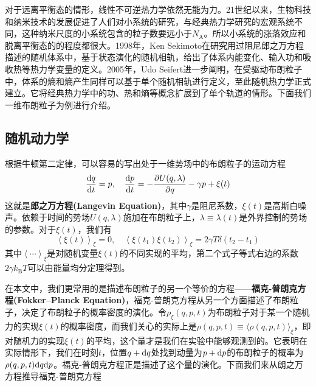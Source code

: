 对于远离平衡态的情形，线性不可逆热力学依然无能为力。21世纪以来，生物科技和纳米技术的发展促进了人们对小系统的研究，与经典热力学研究的宏观系统不同，这种纳米尺度的小系统包含的粒子数要远小于$N_{\mathrm{A}}$。所以小系统的涨落效应和脱离平衡态的的程度都很大。1998年，Ken Sekimoto在研究用过阻尼郎之万方程描述的随机体系中，基于状态演化的随机相轨，给出了体系内能变化、输入功和吸收热等热力学变量的定义\cite{Sekimoto1998}。2005年，Udo Seifert进一步阐明，在受驱动布朗粒子中，体系的熵和熵产生同样可以基于单个随机相轨进行定义\cite{Seifert2005}，至此随机热力学正式建立。它将经典热力学中的功、热和熵等概念扩展到了单个轨道的情形。下面我们一维布朗粒子为例进行介绍。

\subsection{随机动力学}
\label{c1s3}
\qquad 根据牛顿第二定律，可以容易的写出处于一维势场中的布朗粒子的运动方程
\begin{equation}
    \frac{\mathrm{d} q}{\mathrm{d} t}=p, \quad \frac{\mathrm{d} p}{\mathrm{d} t}=-\frac{\partial U(q,\lambda)}{\partial q}-\gamma p+\xi(t)
    \label{eq1.1}
\end{equation}
这就是\textbf{郎之万方程(Langevin Equation)}，其中$\gamma$是阻尼系数，$\xi(t)$是高斯白噪声。依赖于时间的势场$U(q,\lambda)$施加在布朗粒子上，$\lambda\equiv\lambda(t)$是外界控制的势场的参数。对于$\xi(t)$，我们有
\begin{equation}
    \left\langle\xi\left(t\right)\right\rangle_{\xi}=0,\quad \left\langle\xi\left(t_{1}\right) \xi\left(t_{2}\right)\right\rangle_{\xi}=2 \gamma T  \delta\left(t_{2}-t_{1}\right)
    \label{eq1.2}
\end{equation}
其中$\left\langle \cdots \right\rangle_{\xi}$是对随机变量$\xi(t)$的不同实现的平均，第二个式子等式右边的系数$2 \gamma k_{\mathrm{B}} T$可以由能量均分定理得到。\cite{Reichl2016}

在本文中，我们更常用的是描述布朗粒子的另一个等价的方程——\textbf{福克-普朗克方程(Fokker–Planck Equation)}\cite{Reichl2016}，福克-普朗克方程从另一个方面描述了布朗粒子，决定了布朗粒子的概率密度的演化。令$\rho_{\xi}(q,p,t)$为布朗粒子对于某一个随机力的实现$\xi(t)$的概率密度，而我们关心的实际上是$\rho(q,p,t)\equiv\langle \rho(q,p,t) \rangle_{\xi}$，即对随机力的实现$\xi(t)$的平均，这个量才是我们在实验中能够观测到的。它表明在实际情形下，我们在时刻$t$，位置$q+\mathrm{d} q$处找到动量为$p+\mathrm{d} p$的布朗粒子的概率为$\rho(q,p,t) \mathrm{d} q \mathrm{d} p$。福克-普朗克方程正是描述了这个量的演化。下面我们来从朗之万方程推导福克-普朗克方程

